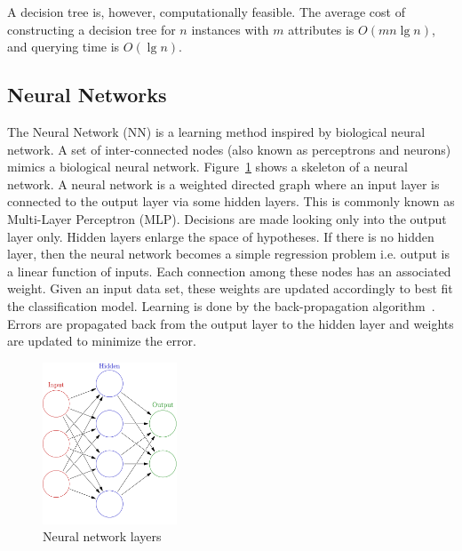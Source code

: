 A decision tree is, however, computationally feasible. The average cost of constructing a decision tree for $n$ instances with $m$ attributes is $O(mn \lg n)$, and querying time is $O(\lg n)$.

\subsection*{Neural Networks}
The Neural Network (NN) is a learning method inspired by biological neural network. A set of inter-connected nodes (also known as perceptrons and neurons) mimics a biological neural network. Figure~\ref{fig:bg:nnlayer} shows a skeleton of a neural network. A neural network is a weighted directed graph where an input layer is connected to the output layer via some hidden layers. This is commonly known as Multi-Layer Perceptron (MLP). Decisions are made looking only into the output layer only. Hidden layers enlarge the space of hypotheses. If there is no hidden layer, then the  neural network becomes a simple regression problem i.e. output is a linear function of inputs. Each connection among these nodes has an associated weight. Given an input data set, these weights are updated accordingly to best fit the classification model. Learning is done by the back-propagation algorithm~\cite{raul96:nn}. Errors are propagated back from the output layer to the hidden layer and weights are updated to minimize the error.
\begin{figure}[htbp]
    \begin{center}
        \includegraphics[width=4.0cm]{figs/nnlayers.png}
        \caption{Neural network layers}
        \label{fig:bg:nnlayer}
    \end{center}
\end{figure}

